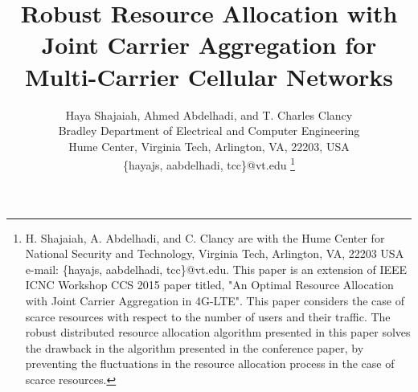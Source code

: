 \documentclass[journal]{IEEEtran} 		\usepackage{amsmath,amssymb}
\begin{document}
\title{Robust Resource Allocation with Joint Carrier Aggregation for Multi-Carrier Cellular Networks}
\author{Haya Shajaiah, Ahmed Abdelhadi, and T. Charles Clancy \\
Bradley Department of Electrical and Computer Engineering\\
Hume Center, Virginia Tech, Arlington, VA, 22203, USA\\
\{hayajs, aabdelhadi, tcc\}@vt.edu
\thanks{H. Shajaiah, A. Abdelhadi, and C. Clancy are with the Hume Center for National Security and Technology, Virginia Tech, Arlington,
VA, 22203 USA e-mail: \{hayajs, aabdelhadi, tcc\}@vt.edu. This paper is an extension of IEEE ICNC Workshop CCS 2015 paper titled, "An Optimal Resource Allocation with Joint Carrier Aggregation in 4G-LTE". This paper considers the case of scarce resources with respect to the number of users and their traffic. The robust distributed resource allocation algorithm presented in this paper solves the drawback in the algorithm presented in the conference paper, by preventing the fluctuations in the resource allocation process in the case of scarce resources.}
}
\end{document}
